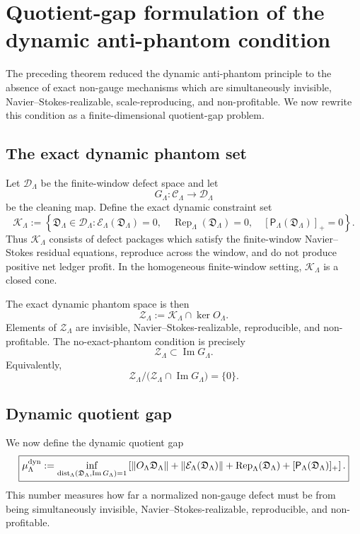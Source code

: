 \documentclass[11pt]{article}
\numberwithin{equation}{section}
\begin{document}
\section{Quotient-gap formulation of the dynamic anti-phantom condition}\label{sec:dynamic-gap-formulation}

The preceding theorem reduced the dynamic anti-phantom principle to the
absence of exact non-gauge mechanisms which are simultaneously invisible,
Navier--Stokes-realizable, scale-reproducing, and non-profitable.  We now
rewrite this condition as a finite-dimensional quotient-gap problem.

\subsection{The exact dynamic phantom set}

Let \(\mathcal D_\Lambda\) be the finite-window defect space and let
\[
        G_\Lambda:\mathcal C_\Lambda\to\mathcal D_\Lambda
\]
be the cleaning map.  Define the exact dynamic constraint set
\[
        \mathcal K_\Lambda
        :=
        \left\{
        \mathfrak D_\Lambda\in\mathcal D_\Lambda:
        \mathcal E_\Lambda(\mathfrak D_\Lambda)=0,\quad
        \operatorname{Rep}_\Lambda(\mathfrak D_\Lambda)=0,\quad
        [\mathsf P_\Lambda(\mathfrak D_\Lambda)]_+=0
        \right\}.
\]
Thus \(\mathcal K_\Lambda\) consists of defect packages which satisfy the
finite-window Navier--Stokes residual equations, reproduce across the
window, and do not produce positive net ledger profit.  In the homogeneous
finite-window setting, \(\mathcal K_\Lambda\) is a closed cone.

The exact dynamic phantom space is then
\[
        \mathcal Z_\Lambda
        :=
        \mathcal K_\Lambda\cap\ker O_\Lambda.
\]
Elements of \(\mathcal Z_\Lambda\) are invisible,
Navier--Stokes-realizable, reproducible, and non-profitable.  The
no-exact-phantom condition is precisely
\[
        \mathcal Z_\Lambda
        \subset
        \operatorname{Im}G_\Lambda .
\]
Equivalently,
\[
        \mathcal Z_\Lambda/
        \bigl(\mathcal Z_\Lambda\cap\operatorname{Im}G_\Lambda\bigr)
        =
        \{0\}.
\]

\subsection{Dynamic quotient gap}

We now define the dynamic quotient gap
\[
\boxed{
        \mu_\Lambda^{\rm dyn}
        :=
        \inf_{\operatorname{dist}_\Lambda
        (\mathfrak D_\Lambda,\operatorname{Im}G_\Lambda)=1}
        \left[
        \|O_\Lambda\mathfrak D_\Lambda\|
        +
        \|\mathcal E_\Lambda(\mathfrak D_\Lambda)\|
        +
        \operatorname{Rep}_\Lambda(\mathfrak D_\Lambda)
        +
        [\mathsf P_\Lambda(\mathfrak D_\Lambda)]_+
        \right].
}
\]
This number measures how far a normalized non-gauge defect must be from
being simultaneously invisible, Navier--Stokes-realizable, reproducible,
and non-profitable.
\end{document}
